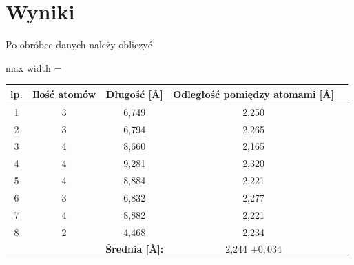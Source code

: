 \documentclass[a4paper,12pt]{extarticle}
\begin{document}
  \clearpage
  \section{Wyniki}
  Po obróbce danych należy obliczyć 

  \begin{table}[H]\centering
    \begin{adjustbox}{max width = \textwidth}
      \begin{tabular}{ccc|cc}
        \multicolumn{1}{c|}{\textbf{lp.}} & \multicolumn{1}{c|}{\textbf{Ilość atomów}} & \textbf{Długość [\r{A}]}  & \textbf{Odległość pomiędzy atomami [\r{A}]} &       \\ \hline
        \multicolumn{1}{c|}{1}            & \multicolumn{1}{c|}{3}                     & 6,749             & 2,250                               &       \\
        \multicolumn{1}{c|}{2}            & \multicolumn{1}{c|}{3}                     & 6,794             & 2,265                               &       \\
        \multicolumn{1}{c|}{3}            & \multicolumn{1}{c|}{4}                     & 8,660             & 2,165                               &       \\
        \multicolumn{1}{c|}{4}            & \multicolumn{1}{c|}{4}                     & 9,281             & 2,320                               &       \\
        \multicolumn{1}{c|}{5}            & \multicolumn{1}{c|}{4}                     & 8,884             & 2,221                               &       \\
        \multicolumn{1}{c|}{6}            & \multicolumn{1}{c|}{3}                     & 6,832             & 2,277                               &       \\
        \multicolumn{1}{c|}{7}            & \multicolumn{1}{c|}{4}                     & 8,882             & 2,221                               &       \\
        \multicolumn{1}{c|}{8}            & \multicolumn{1}{c|}{2}                     & 4,468             & 2,234                               &       \\ \hline
                                          &                                            & \textbf{Średnia [\r{A}]:} & 2,244 $\pm0,034$
        \end{tabular}
    \end{adjustbox}
  \end{table}
\end{document}
